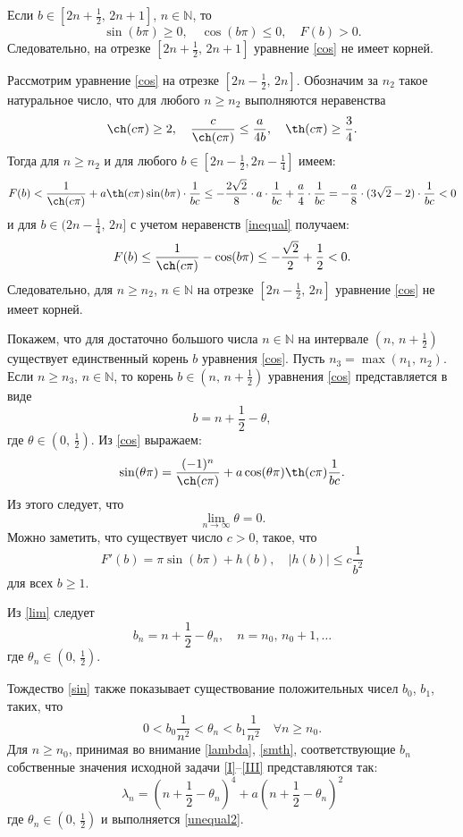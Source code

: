 \documentclass[12pt, a4paper]{article}
\begin{document}
Если $b\in [2n+\frac12,\,2n+1]$, $n\in\mathbb{N}$, то
\[
\sin(b\pi)\ge 0, \quad \cos(b\pi)\le 0,\quad F(b)>0.
\] 
Следовательно, на отрезке $[2n+\frac12,\,2n+1]$ уравнение \eqref{cos} не имеет корней.

Рассмотрим уравнение \eqref{cos} на отрезке $[2n-\frac12,\,2n]$. Обозначим за $n_2$ такое натураль\-ное число, что для любого $n\ge n_2$ выполняются неравенства
\begin{equation}  \label{inequal}
\ch(c\pi)\ge 2,\quad \frac{c}{\ch(c\pi)}\le \frac{a}{4b},\quad \th(c\pi)\ge\frac34.
\end{equation}
Тогда для $n\ge n_2$ и для любого $b\in [2n-\frac12,2n-\frac14]$ имеем:
\[
F(b)<\frac{1}{\ch(c\pi)} + a\th(c\pi)\sin(b\pi)\cdot\frac{1}{bc}\le -\frac{2\sqrt{2}}{8}\cdot a\cdot\frac{1}{bc} + \frac{a}{4}\cdot\frac{1}{bc} = -\frac{a}{8} \cdot(3\sqrt{2}-2)\cdot\frac{1}{bc}<0
\]
и для $b\in(2n-\frac14,\,2n]$ с учетом неравенств \eqref{inequal} получаем:
\[
F(b)\le \frac{1}{\ch(c\pi)}-\cos(b\pi)\le -\frac{\sqrt{2}}{2}+\frac12<0.
\]
Следовательно, для $n\ge n_2$, $n\in\mathbb{N}$ на отрезке $[2n-\frac12,\,2n]$ уравнение \eqref{cos} не имеет корней.

Покажем, что для достаточно большого числа $n\in \mathbb{N}$ на интервале $(n,\,n+\frac12)$ существует единственный корень $b$ уравнения \eqref{cos}. Пусть $n_3=\max(n_1,\,n_2)$. Если \mbox{$n\ge n_3$}, $n\in \mathbb{N}$, то корень $b\in (n,\,n+\frac12)$ уравнения \eqref{cos} представляется в виде 
\begin{equation}
b=n+\frac12 - \theta,
\end{equation}
где $\theta\in (0,\,\frac12)$.
Из \eqref{cos} выражаем:
\begin{equation}
\sin(\theta\pi)=\frac{(-1)^n}{\ch(c\pi)} + a\cos(\theta\pi)\th(c\pi)\frac{1}{bc}. \label{sin}
\end{equation}
Из этого следует, что
\begin{equation}
\lim\limits_{n\to\infty} \theta = 0. \label{lim}
\end{equation}
Можно заметить, что существует число $c>0$, такое, что
\[
F'(b)=\pi\sin(b\pi) + h(b), \quad |h(b)|\le c\frac{1}{b^2}
\]
для всех $b\ge 1$.

Из \eqref{lim} следует
\begin{equation}
b_n=n+\frac12-\theta_n, \quad n=n_0,\,n_0+1,\dots \label{smth}
\end{equation}
где $\theta_n\in (0,\,\frac12)$.

Тождество \eqref{sin} также показывает существование положительных чисел $b_0$, $b_1$, таких, что
\begin{equation}
0<b_0\frac{1}{n^2}<\theta_n<b_1\frac{1}{n^2} \quad \forall n\ge n_0. \label{unequal2}
\end{equation}
Для $n\ge n_0$, принимая во внимание \eqref{lambda}, \eqref{smth}, соответствующие $b_n$ собствен\-ные значения исходной задачи \eqref{I}--\eqref{III} представляются так:
\[
\lambda_n = (n+\frac12 - \theta_n)^4 + a(n+\frac12 - \theta_n)^2
\]
где $\theta_n\in (0,\,\frac12)$ и выполняется \eqref{unequal2}.
\end{document}
